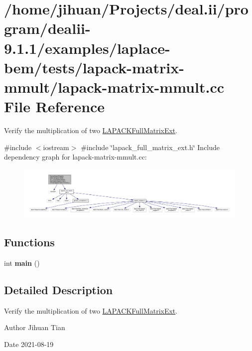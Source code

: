 \hypertarget{lapack-matrix-mmult_8cc}{}\section{/home/jihuan/\+Projects/deal.ii/program/dealii-\/9.1.1/examples/laplace-\/bem/tests/lapack-\/matrix-\/mmult/lapack-\/matrix-\/mmult.cc File Reference}
\label{lapack-matrix-mmult_8cc}


Verify the multiplication of two {\ttfamily \hyperlink{classLAPACKFullMatrixExt}{L\+A\+P\+A\+C\+K\+Full\+Matrix\+Ext}}.  


{\ttfamily \#include $<$iostream$>$}\newline
{\ttfamily \#include \char`\"{}lapack\+\_\+full\+\_\+matrix\+\_\+ext.\+h\char`\"{}}\newline
Include dependency graph for lapack-\/matrix-\/mmult.cc\+:\nopagebreak
\begin{figure}[H]
\begin{center}
\leavevmode
\includegraphics[width=350pt]{lapack-matrix-mmult_8cc__incl}
\end{center}
\end{figure}
\subsection*{Functions}
\begin{DoxyCompactItemize}
\item 
\mbox{\label{lapack-matrix-mmult_8cc_ae66f6b31b5ad750f1fe042a706a4e3d4}} 
int {\bfseries main} ()
\end{DoxyCompactItemize}


\subsection{Detailed Description}
Verify the multiplication of two {\ttfamily \hyperlink{classLAPACKFullMatrixExt}{L\+A\+P\+A\+C\+K\+Full\+Matrix\+Ext}}. 

\begin{DoxyAuthor}{Author}
Jihuan Tian 
\end{DoxyAuthor}
\begin{DoxyDate}{Date}
2021-\/08-\/19 
\end{DoxyDate}
